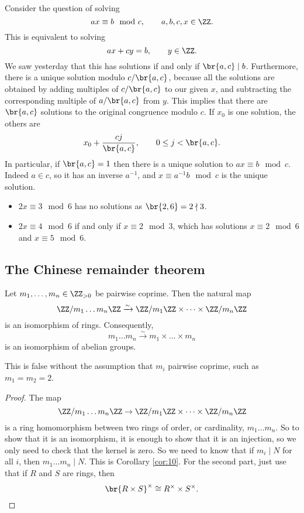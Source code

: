 Consider the question of solving
$$ ax \equiv b \mod c, \qquad a, b, c, x \in \ZZ. $$
This is equivalent to solving
$$ ax + cy = b, \qquad y \in \ZZ. $$
We saw yesterday that this has solutions if and only if $ \br{a, c} \mid b $. Furthermore, there is a unique solution modulo $ c / \br{a, c} $, because all the solutions are obtained by adding multiples of $ c / \br{a, c} $ to our given $ x $, and subtracting the corresponding multiple of $ a / \br{a, c} $ from $ y $. This implies that there are $ \br{a, c} $ solutions to the original congruence modulo $ c $. If $ x_0 $ is one solution, the others are
$$ x_0 + \dfrac{cj}{\br{a, c}}, \qquad 0 \le j < \br{a, c}. $$
In particular, if $ \br{a, c} = 1 $ then there is a unique solution to $ ax \equiv b \mod c $. Indeed $ a \in \unit{c} $, so it has an inverse $ a^{-1} $, and $ x \equiv a^{-1}b \mod c $ is the unique solution.

\begin{example*}
\hfill
\begin{itemize}
\item $ 2x \equiv 3 \mod 6 $ has no solutions as $ \br{2, 6} = 2 \nmid 3 $.
\item $ 2x \equiv 4 \mod 6 $ if and only if $ x \equiv 2 \mod 3 $, which has solutions $ x \equiv 2 \mod 6 $ and $ x \equiv 5 \mod 6 $.
\end{itemize}
\end{example*}

\subsection{The Chinese remainder theorem}

\begin{theorem}
\label{thm:14}
Let $ m_1, \dots, m_n \in \ZZ_{> 0} $ be pairwise coprime. Then the natural map
$$ \ZZ / m_1 \dots m_n\ZZ \xrightarrow{\sim} \ZZ / m_1\ZZ \times \dots \times \ZZ / m_n\ZZ $$
is an isomorphism of rings. Consequently,
$$ \unit{m_1 \dots m_n} \xrightarrow{\sim} \unit{m_1} \times \dots \times \unit{m_n} $$
is an isomorphism of abelian groups.
\end{theorem}

\begin{remark*}
This is false without the assumption that $ m_i $ pairwise coprime, such as $ m_1 = m_2 = 2 $.
\end{remark*}

\begin{proof}
The map
$$ \ZZ / m_1 \dots m_n\ZZ \to \ZZ / m_1\ZZ \times \dots \times \ZZ / m_n\ZZ $$
is a ring homomorphism between two rings of order, or cardinality, $ m_1 \dots m_n $. So to show that it is an isomorphism, it is enough to show that it is an injection, so we only need to check that the kernel is zero. So we need to know that if $ m_i \mid N $ for all $ i $, then $ m_1 \dots m_n \mid N $. This is Corollary \ref{cor:10}. For the second part, just use that if $ R $ and $ S $ are rings, then
$$ \br{R \times S}^\times \cong R^\times \times S^\times. $$
\end{proof}

